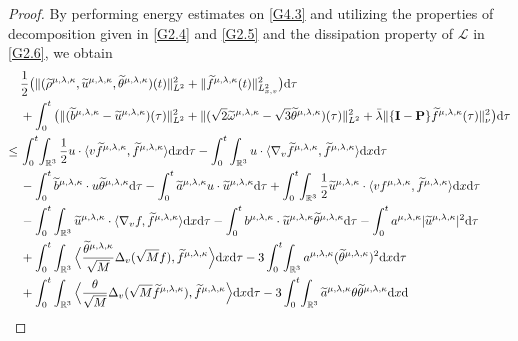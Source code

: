 \documentclass[reqno,11pt]{amsart}
\theoremstyle{plain}
\numberwithin{equation}{section}
\begin{document}
\begin{proof}
By performing energy estimates on \eqref{G4.3} and utilizing the properties of decomposition given in \eqref{G2.4} and \eqref{G2.5} and the dissipation property of $\mathcal{L}$ in \eqref{G2.6}, we obtain  
\begin{align}\label{G4.8}
&\frac{1}{2}\big( \|(\widetilde{\rho}^{\mu,\lambda,\kappa},\widetilde{u}^{\mu,\lambda,\kappa},\widetilde\theta^{\mu,\lambda,\kappa})(t)\|_{L^2}^2+  \|\widetilde{f}^{\mu,\lambda,\kappa}(t)\|_{L_{x,v}^2}^2 \big) {\rm d}\tau\nonumber\\
&+\int_0^t\big( \|(\widetilde{b}^{\mu,\lambda,\kappa}-\widetilde{u}^{\mu,\lambda,\kappa})(\tau)\|_{L^2}^2 +\|(\sqrt{2}\widetilde{\omega}^{\mu,\lambda,\kappa}-\sqrt{3}\widetilde{\theta}^{\mu,\lambda,\kappa})(\tau)\|_{L^2}^2+\bar\lambda\|  \{\mathbf{I}-\mathbf{P}\}\widetilde{f}^{\mu,\lambda,\kappa}(\tau)\|_{\nu}^2   \big){\rm d}\tau\nonumber\\
\leq\,&\int_0^t\!   \int_{\mathbb{R}^3 }\frac{1}{2} u\cdot\langle v\widetilde{f}^{\mu,\lambda,\kappa},\widetilde{f}^{\mu,\lambda,\kappa}\rangle {\rm d}x{\rm d}\tau-\int_0^t  \int_{\mathbb{R}^3 } u\cdot\langle \nabla_v\widetilde{f}^{\mu,\lambda,\kappa},\widetilde{f}^{\mu,\lambda,\kappa}\rangle {\rm d}x{\rm d}\tau\nonumber\\
&-\int_0^t \widetilde{b}^{\mu,\lambda,\kappa}\cdot {u} \widetilde{\theta}^{\mu,\lambda,\kappa}{\rm d}\tau-\int_0^t \widetilde{a}^{\mu,\lambda,\kappa} u\cdot\widetilde{u}^{\mu,\lambda,\kappa} {\rm d}{\tau} +\int_0^t \! \int_{\mathbb{R}^3 }\frac{1}{2} \widetilde{u}^{\mu,\lambda,\kappa}\cdot\langle v{f}^{\mu,\lambda,\kappa},\widetilde{f}^{\mu,\lambda,\kappa}\rangle {\rm d}x{\rm d}\tau           \nonumber\\
&-\int_0^t  \int_{\mathbb{R}^3 } \widetilde{u}^{\mu,\lambda,\kappa}\cdot\langle \nabla_v {f} ,\widetilde{f}^{\mu,\lambda,\kappa}\rangle {\rm d}x{\rm d}\tau-\int_0^t {b}^{\mu,\lambda,\kappa}\cdot  \widetilde{u}^{\mu,\lambda,\kappa}\widetilde{\theta}^{\mu,\lambda,\kappa}{\rm d}\tau     -\int_0^t{a}^{\mu,\lambda,\kappa} |\widetilde{u}^{\mu,\lambda,\kappa}|^2 {\rm d}{\tau}       \nonumber\\
&+\int_0^t  \int_{\mathbb{R}^3}\Big\langle\frac{\widetilde\theta^{\mu,\lambda,\kappa}}{\sqrt{M}}\Delta_v(\sqrt{M}f),\widetilde{f}^{\mu,\lambda,\kappa}\Big\rangle{\rm d}x{\rm d}{\tau}-3\int_0^t\!\int_{\mathbb{R}^3}a^{\mu,\lambda,\kappa}(\widetilde\theta^{\mu,\lambda,\kappa})^2{\rm d}x{\rm d}
\tau\nonumber\\
&+\int_0^t \int_{\mathbb{R}^3}\Big\langle\frac{\theta}{\sqrt{M}}\Delta_v(\sqrt{M}\widetilde{f}^{\mu,\lambda,\kappa}),\widetilde{f}^{\mu,\lambda,\kappa}\Big\rangle{\rm d}x{\rm d}{\tau}-3\int_0^t\!\int_{\mathbb{R}^3}\widetilde{a}^{\mu,\lambda,\kappa} \theta\widetilde{\theta}^{\mu,\lambda,\kappa} {\rm d}x{\rm d}

\end{align}
\end{proof}
\end{document}
